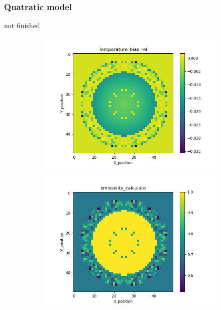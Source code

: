 \subsubsection{Quatratic model}
not finished
\begin{figure}[htbp]
    \centering
    \begin{minipage}{\textwidth}
        \centering
        \begin{subfigure}{0.49\textwidth}
            \centering
            \includegraphics[width=\textwidth]{figures/raw_data/0/mix/T_bias.jpg}
        \end{subfigure}
        \begin{subfigure}{0.49\textwidth}
            \centering
            \includegraphics[width=\textwidth]{figures/raw_data/0/mix/emi_cal.jpg}

\end{subfigure}
\end{minipage}
\end{figure}
